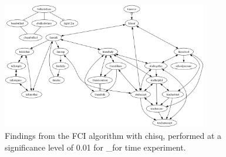 \begin{figure}[htbp]
    \centering
    \includegraphics[width=0.8\textwidth]{Report/final_report/pictures/FCI_chisq_0.01__for time experiment.png}
    \caption{Findings from the FCI algorithm with chisq, performed at a significance level of 0.01 for _for time experiment.}
    \label{fig:fci_chisq_0.01_for time experiment}
\end{figure}
